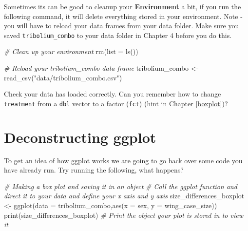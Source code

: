 \documentclass[
]{book}
\newenvironment{Shaded}{\begin{snugshade}}{\end{snugshade}}
\newcommand{\AttributeTok}[1]{\textcolor[rgb]{0.77,0.63,0.00}{#1}}
\newcommand{\CommentTok}[1]{\textcolor[rgb]{0.56,0.35,0.01}{\textit{#1}}}
\newcommand{\FunctionTok}[1]{\textcolor[rgb]{0.00,0.00,0.00}{#1}}
\newcommand{\NormalTok}[1]{#1}
\newcommand{\OtherTok}[1]{\textcolor[rgb]{0.56,0.35,0.01}{#1}}
\newcommand{\StringTok}[1]{\textcolor[rgb]{0.31,0.60,0.02}{#1}}
\begin{document}
Sometimes its can be good to cleanup your \textbf{Environment} a bit, if you run the following command, it will delete everything stored in your environment. Note - you will have to reload your data frames from your data folder. Make sure you saved \texttt{tribolium\_combo} to your data folder in Chapter 4 before you do this.

\begin{Shaded}
\begin{Highlighting}[]
\CommentTok{\# Clean up your environment}
\FunctionTok{rm}\NormalTok{(}\AttributeTok{list =} \FunctionTok{ls}\NormalTok{())}
\end{Highlighting}
\end{Shaded}

\begin{Shaded}
\begin{Highlighting}[]
\CommentTok{\# Reload your tribolium\_combo data frame}
\NormalTok{tribolium\_combo }\OtherTok{\textless{}{-}} \FunctionTok{read\_csv}\NormalTok{(}\StringTok{"data/tribolium\_combo.csv"}\NormalTok{)}
\end{Highlighting}
\end{Shaded}

Check your data has loaded correctly. Can you remember how to change \texttt{treatment} from a \texttt{dbl} vector to a factor (\texttt{fct}) (hint in Chapter \ref{boxplot})?

\hypertarget{deconstructing-ggplot}{%
\section{Deconstructing ggplot}\label{deconstructing-ggplot}}

To get an idea of how ggplot works we are going to go back over some code you have already run. Try running the following, what happens?

\begin{Shaded}
\begin{Highlighting}[]
\CommentTok{\# Making a box plot and saving it in an object}
\CommentTok{\# Call the ggplot function and direct it to your data and define your x axis and y axis}
\NormalTok{size\_differences\_boxplot }\OtherTok{\textless{}{-}} \FunctionTok{ggplot}\NormalTok{(}\AttributeTok{data =}\NormalTok{ tribolium\_combo,}\FunctionTok{aes}\NormalTok{(}\AttributeTok{x =}\NormalTok{ sex, }\AttributeTok{y =}\NormalTok{ wing\_case\_size)) }
\FunctionTok{print}\NormalTok{(size\_differences\_boxplot) }\CommentTok{\# Print the object your plot is stored in to view it}
\end{Highlighting}
\end{Shaded}
\end{document}
